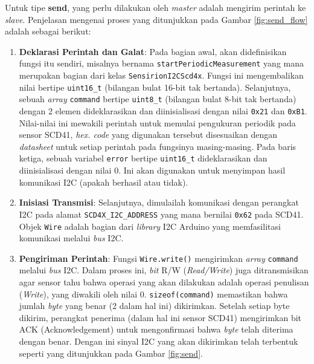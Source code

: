         Untuk tipe \textbf{send}, yang perlu dilakukan oleh \textit{master} adalah mengirim perintah ke \textit{slave}. Penjelasan mengenai proses yang ditunjukkan pada Gambar \ref{fig:send_flow} adalah sebagai berikut:

        \begin{enumerate}
            \item \textbf{Deklarasi Perintah dan Galat}: Pada bagian awal, akan didefinisikan fungsi itu sendiri, misalnya bernama \texttt{startPeriodicMeasurement} yang mana merupakan bagian dari kelas \texttt{SensirionI2CScd4x}. Fungsi ini mengembalikan nilai bertipe \texttt{uint16\_t} (bilangan bulat 16-bit tak bertanda). Selanjutnya, sebuah \textit{array} \texttt{command} bertipe \texttt{uint8\_t} (bilangan bulat 8-bit tak bertanda) dengan 2 elemen dideklarasikan dan diinisialisasi dengan nilai \texttt{0x21} dan \texttt{0xB1}. Nilai-nilai ini mewakili perintah untuk memulai pengukuran periodik pada sensor SCD41, \textit{hex. code} yang digunakan tersebut disesuaikan dengan \textit{datasheet} untuk setiap perintah pada fungsinya masing-masing. Pada baris ketiga, sebuah variabel \texttt{error} bertipe \texttt{uint16\_t} dideklarasikan dan diinisialisasi dengan nilai 0. Ini akan digunakan untuk menyimpan hasil komunikasi I2C (apakah berhasil atau tidak).

            \item \textbf{Inisiasi Transmisi}: Selanjutnya, dimulailah komunikasi dengan perangkat I2C pada alamat \texttt{SCD4X\_I2C\_ADDRESS} yang mana bernilai \texttt{0x62} pada SCD41. Objek \texttt{Wire} adalah bagian dari \textit{library} I2C Arduino yang memfasilitasi komunikasi melalui \textit{bus} I2C.

            \item \textbf{Pengiriman Perintah}: Fungsi \texttt{Wire.write()} mengirimkan \textit{array} \texttt{command} melalui \textit{bus} I2C. Dalam proses ini, \textit{bit} R/W (\textit{Read/Write}) juga ditransmisikan agar sensor tahu bahwa operasi yang akan dilakukan adalah operasi penulisan (\textit{Write}), yang diwakili oleh nilai 0. \texttt{sizeof(command)} memastikan bahwa jumlah \textit{byte} yang benar (2 dalam hal ini) dikirimkan. Setelah setiap byte dikirim, perangkat penerima (dalam hal ini sensor SCD41) mengirimkan bit ACK (Acknowledgement) untuk mengonfirmasi bahwa \textit{byte} telah diterima dengan benar. Dengan ini sinyal I2C yang akan dikirimkan telah terbentuk seperti yang ditunjukkan pada Gambar \ref{fig:send}.
            

\end{enumerate}
